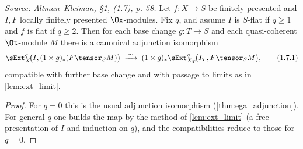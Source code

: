 \begin{lemma}
  \label{lem:ext_adjunction}
  \textit{Source: Altman--Kleiman, §1, (1.7), p. 58.}
  Let $f : X \to S$ be finitely presented and $I, F$ locally finitely presented
  $\Ox$-modules. Fix $q$, and assume $I$ is $S$-flat if $q \geq 1$ and $f$ is flat
  if $q \geq 2$. Then for each base change $g : T \to S$ and each quasi-coherent
  $\Ot$-module $M$ there is a canonical adjunction isomorphism
  \[
    \sExt^q_X\!\big(I, (1\times g)_*(F \tensor_S M)\big)
      \;\xrightarrow{\;\sim\;}\;
      (1\times g)_* \sExt^q_{X_T}\!\big(I_T, F \tensor_S M\big),
      \tag{1.7.1}
  \]
  compatible with further base change and with passage to limits as in
  \cref{lem:ext_limit}.
  \begin{proof}
    For $q = 0$ this is the usual adjunction isomorphism
    (\cref{thm:ega_adjunction}). For general $q$ one builds the map by the method
    of \cref{lem:ext_limit} (a free presentation of $I$ and induction on $q$),
    and the compatibilities reduce to those for $q = 0$.
  \end{proof}
\end{lemma}


